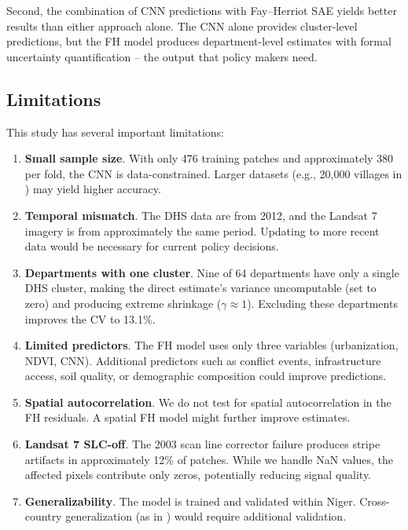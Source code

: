 \documentclass[11pt,a4paper]{article}
\begin{document}
Second, the combination of CNN predictions with Fay--Herriot SAE yields better results than either approach alone. The CNN alone provides cluster-level predictions, but the FH model produces department-level estimates with formal uncertainty quantification -- the output that policy makers need.

\subsection{Limitations}

This study has several important limitations:

\begin{enumerate}
    \item \textbf{Small sample size}. With only 476 training patches and approximately 380 per fold, the CNN is data-constrained. Larger datasets (e.g., 20,000 villages in \citet{yeh2020}) may yield higher accuracy.
    \item \textbf{Temporal mismatch}. The DHS data are from 2012, and the Landsat 7 imagery is from approximately the same period. Updating to more recent data would be necessary for current policy decisions.
    \item \textbf{Departments with one cluster}. Nine of 64 departments have only a single DHS cluster, making the direct estimate's variance uncomputable (set to zero) and producing extreme shrinkage ($\gamma \approx 1$). Excluding these departments improves the CV to 13.1\%.
    \item \textbf{Limited predictors}. The FH model uses only three variables (urbanization, NDVI, CNN). Additional predictors such as conflict events, infrastructure access, soil quality, or demographic composition could improve predictions.
    \item \textbf{Spatial autocorrelation}. We do not test for spatial autocorrelation in the FH residuals. A spatial FH model \citep{petrucci2004} might further improve estimates.
    \item \textbf{Landsat 7 SLC-off}. The 2003 scan line corrector failure produces stripe artifacts in approximately 12\% of patches. While we handle NaN values, the affected pixels contribute only zeros, potentially reducing signal quality.
    \item \textbf{Generalizability}. The model is trained and validated within Niger. Cross-country generalization (as in \citet{deepwealth2024}) would require additional validation.
\end{enumerate}
\end{document}
